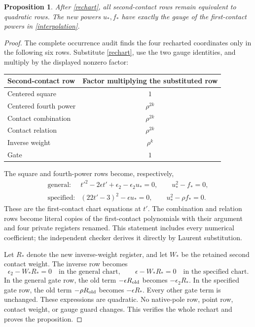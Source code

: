 \documentclass[11pt]{article}
\newtheorem{proposition}{Proposition}\newtheorem{theorem}[proposition]{Theorem}
\begin{document}
\begin{proposition}\label{chart}
After \eqref{rechart}, all second-contact rows remain equivalent to
quadratic rows. The new powers \(u_*,f_*\) have exactly the gauge
of the first-contact powers in \eqref{interpolation}.
\end{proposition}
\begin{proof}
The complete occurrence audit finds the four recharted coordinates
only in the following six rows. Substitute \eqref{rechart}, use the
two gauge identities, and multiply by the displayed nonzero factor:
\begin{center}
\begin{tabular}{lc}
\toprule
Second-contact row & Factor multiplying the substituted row\\
\midrule
Centered square & \(1\)\\
Centered fourth power & \(\rho^{2k}\)\\
Contact combination & \(\rho^{2k}\)\\
Contact relation & \(\rho^{2k}\)\\
Inverse weight & \(\rho^k\)\\
Gate & \(1\)\\
\bottomrule
\end{tabular}
\end{center}
The square and fourth-power rows become, respectively,
\[
 \begin{array}{ll}
 \text{general}:&
 t'^2-2\epsilon t'+\epsilon_2-\epsilon_2u_*=0,
 \qquad u_*^2-f_*=0,\\[2pt]
 \text{specified}:&
 (22t'-3)^2-\epsilon u_*=0,
 \qquad u_*^2-\rho f_*=0.
 \end{array}
\]
These are the first-contact chart equations at \(t'\).
The combination and relation rows become literal copies of the
first-contact polynomials with their argument and four private
registers renamed. This statement includes every numerical coefficient;
the independent checker derives it directly by Laurent substitution.

Let \(R_*\) denote the new inverse-weight register, and let \(W_*\)
be the retained second contact weight. The inverse row becomes
\[
 \epsilon_2-W_*R_*=0\quad\text{in the general chart},\qquad
 \epsilon-W_*R_*=0\quad\text{in the specified chart}.
\]
In the general gate row, the old term \(-\epsilon R_{\rm old}\)
becomes \(-\epsilon_2R_*\). In the specified gate row, the old
term \(-\rho R_{\rm old}\) becomes \(-\epsilon R_*\).
Every other gate term is unchanged. These expressions are quadratic.
No native-pole row, point row, contact weight, or gauge guard changes.
This verifies the whole rechart and proves the proposition.
\end{proof}
\end{document}
